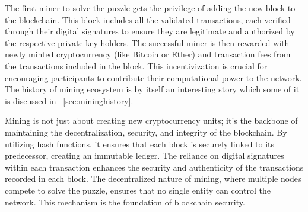 The first miner to solve the puzzle gets the privilege of adding the new block to the blockchain. This block includes all the validated transactions, each verified through their digital signatures to ensure they are legitimate and authorized by the respective private key holders. The successful miner is then rewarded with newly minted cryptocurrency (like Bitcoin or Ether) and transaction fees from the transactions included in the block. This incentivization is crucial for encouraging participants to contribute their computational power to the network. The history of mining ecosystem is by itself an interesting story which some of it is discussed in ~\ref{sec:mininghistory}.



Mining is not just about creating new cryptocurrency units; it's the backbone of maintaining the decentralization, security, and integrity of the blockchain. By utilizing hash functions, it ensures that each block is securely linked to its predecessor, creating an immutable ledger. The reliance on digital signatures within each transaction enhances the security and authenticity of the transactions recorded in each block. The decentralized nature of mining, where multiple nodes compete to solve the puzzle, ensures that no single entity can control the network. This mechanism is the foundation of blockchain security.



